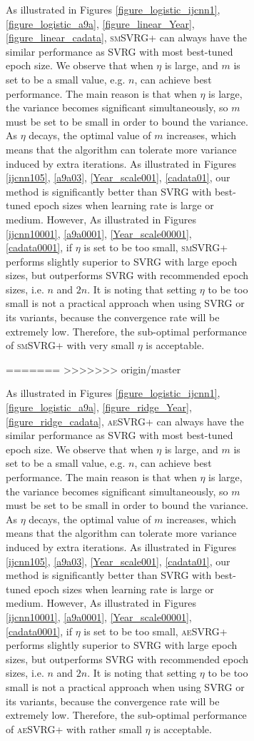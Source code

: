 \documentclass[conference]{IEEEtran}
\begin{document}
\begin{algorithm}[t]
\begin{itemize}
\begin{figure}[ht]
\begin{figure}[ht]
As illustrated in Figures \ref{figure_logistic_ijcnn1}, \ref{figure_logistic_a9a}, \ref{figure_linear_Year}, \ref{figure_linear_cadata},  \textsc{smSVRG+} can always have the similar performance as SVRG with most best-tuned epoch size. We observe that when $\eta$ is large,  and $m$ is set to be a small value, e.g. $n$, can achieve best performance. The main reason is that when $\eta$ is large, the variance becomes significant simultaneously, so $m$ must be set to be small in order to bound the variance. As $\eta$ decays, the optimal value of $m$ increases, which means that the algorithm can tolerate more variance induced by extra iterations. As illustrated in Figures \ref{ijcnn105}, \ref{a9a03}, \ref{Year_scale001}, \ref{cadata01}, our method is significantly better than SVRG with best-tuned epoch sizes when learning rate is large or medium. However, As illustrated in Figures \ref{ijcnn10001}, \ref{a9a0001}, \ref{Year_scale00001}, \ref{cadata0001}, if $\eta$ is set to be too small, \textsc{smSVRG+} performs slightly superior to  SVRG with large epoch sizes, but outperforms SVRG with recommended epoch sizes, i.e. $n$ and $2n$. It is noting that setting $\eta$ to be too small is not a practical approach when using SVRG or its variants, because the convergence rate will be extremely low. Therefore, the sub-optimal performance of \textsc{smSVRG+} with very small $\eta$ is acceptable.

=======
>>>>>>> origin/master

As illustrated in Figures \ref{figure_logistic_ijcnn1}, \ref{figure_logistic_a9a}, \ref{figure_ridge_Year}, \ref{figure_ridge_cadata},  \textsc{aeSVRG+} can always have the similar performance as SVRG with most best-tuned epoch size. We observe that when $\eta$ is large,  and $m$ is set to be a small value, e.g. $n$, can achieve best performance. The main reason is that when $\eta$ is large, the variance becomes significant simultaneously, so $m$ must be set to be small in order to bound the variance. As $\eta$ decays, the optimal value of $m$ increases, which means that the algorithm can tolerate more variance induced by extra iterations. As illustrated in Figures \ref{ijcnn105}, \ref{a9a03}, \ref{Year_scale001}, \ref{cadata01}, our method is significantly better than SVRG with best-tuned epoch sizes when learning rate is large or medium. However, As illustrated in Figures \ref{ijcnn10001}, \ref{a9a0001}, \ref{Year_scale00001}, \ref{cadata0001}, if $\eta$ is set to be too small, \textsc{aeSVRG+} performs slightly superior to  SVRG with large epoch sizes, but outperforms SVRG with recommended epoch sizes, i.e. $n$ and $2n$. It is noting that setting $\eta$ to be too small is not a practical approach when using SVRG or its variants, because the convergence rate will be extremely low. Therefore, the sub-optimal performance of \textsc{aeSVRG+} with rather small $\eta$ is acceptable.


\end{figure}
\end{figure}
\end{itemize}
\end{algorithm}
\end{document}
